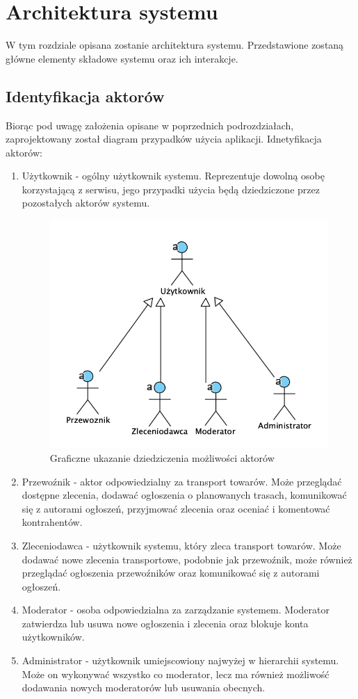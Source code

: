 \chapter{Architektura systemu}
W tym rozdziale opisana zostanie architektura systemu. Przedstawione zostaną główne elementy składowe systemu oraz ich interakcje. 

\section{Identyfikacja aktorów}
Biorąc pod uwagę założenia opisane w poprzednich podrozdziałach, zaprojektowany został diagram przypadków użycia aplikacji. Idnetyfikacja aktorów:
\begin{enumerate}
\item Użytkownik - ogólny użytkownik systemu. Reprezentuje dowolną osobę korzystającą z serwisu, jego przypadki użycia będą dziedziczone przez pozostałych aktorów systemu.
\begin{figure}[H]
	\centering
		\includegraphics[width=0.6\linewidth]{rozdzial1/dziedziczenie.png}
	\caption{Graficzne ukazanie dziedziczenia możliwości aktorów}
	\label{Rys. fig:Graficzne ukazanie dziedziczenia możliwości aktorów}
\end{figure}
\item Przewoźnik - aktor odpowiedzialny za transport towarów. Może przeglądać dostępne zlecenia, dodawać ogłoszenia o planowanych trasach, komunikować się z autorami ogłoszeń, przyjmować zlecenia oraz oceniać i komentować kontrahentów.
\item Zleceniodawca - użytkownik systemu, który zleca transport towarów. Może dodawać nowe zlecenia transportowe, podobnie jak przewoźnik, może również przeglądać ogłoszenia przewoźników oraz komunikować się z autorami ogłoszeń.
\item Moderator - osoba odpowiedzialna za zarządzanie systemem. Moderator zatwierdza lub usuwa nowe ogłoszenia i zlecenia oraz blokuje konta użytkowników.
\item Administrator - użytkownik umiejscowiony najwyżej w hierarchii systemu. Może on wykonywać wszystko co moderator, lecz ma również możliwość dodawania nowych moderatorów lub usuwania obecnych.
\end{enumerate}

